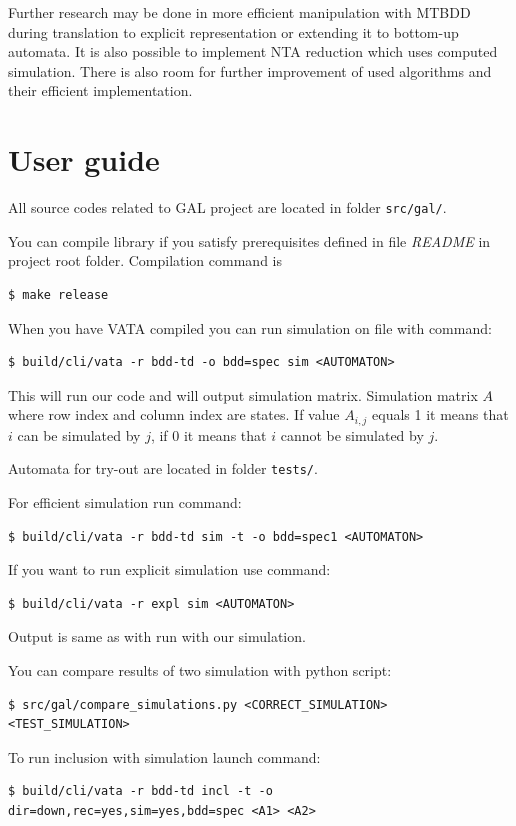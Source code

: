 \documentclass[a4paper, 12pt]{article}
\begin{document}
Further research may be done in more efficient manipulation with MTBDD during translation to explicit representation or
extending it to bottom-up automata.
It is also possible to implement NTA reduction which uses computed simulation.
There is also room for further improvement of used algorithms and their efficient implementation.

\newpage
\appendix
\section{User guide}
\label{app:usage}
All source codes related to GAL project are located in folder \texttt{src/gal/}.

You can compile library if you satisfy prerequisites defined in file \textit{README} in project root folder. Compilation command is
\begin{verbatim}
$ make release
\end{verbatim}

When you have VATA compiled you can run simulation on file with command:
\begin{verbatim}
$ build/cli/vata -r bdd-td -o bdd=spec sim <AUTOMATON>
\end{verbatim}
This will run our code and will output simulation matrix. Simulation matrix $A$ where row index and column index are states. If value $A_{i,j}$ equals 1 it means that $i$ can be simulated by $j$, if 0 it means that $i$ cannot be simulated by $j$.

Automata for try-out are located in folder \texttt{tests/}.

For efficient simulation run command:
\begin{verbatim}
$ build/cli/vata -r bdd-td sim -t -o bdd=spec1 <AUTOMATON>
\end{verbatim}

If you want to run explicit simulation use command:
\begin{verbatim}
$ build/cli/vata -r expl sim <AUTOMATON>
\end{verbatim}
Output is same as with run with our simulation.

You can compare results of two simulation with python script:
\begin{verbatim}
$ src/gal/compare_simulations.py <CORRECT_SIMULATION> <TEST_SIMULATION>
\end{verbatim}

To run inclusion with simulation launch command:
\begin{verbatim}
$ build/cli/vata -r bdd-td incl -t -o dir=down,rec=yes,sim=yes,bdd=spec <A1> <A2>
\end{verbatim}
\end{document}

